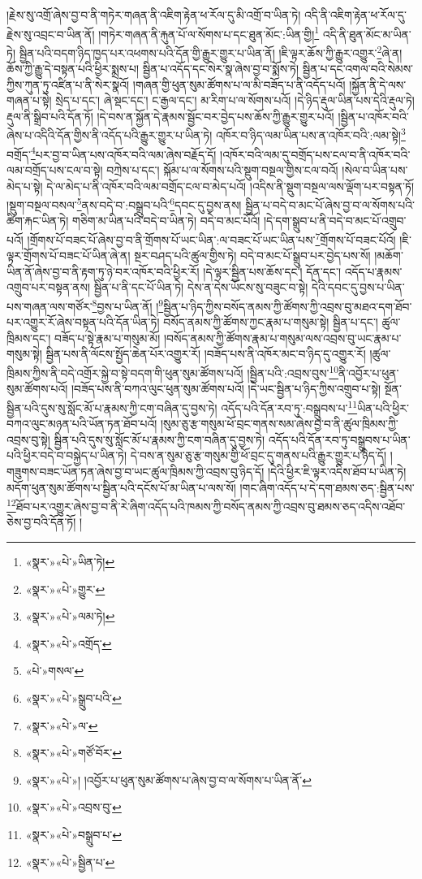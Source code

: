 །རྗེས་སུ་འགྲོ་ཞེས་བྱ་བ་ནི་གཏེར་གཞན་ནི་འཇིག་རྟེན་ཕ་རོལ་དུ་མི་འགྲོ་བ་ཡིན་ཏེ། འདི་ནི་འཇིག་རྟེན་ཕ་རོལ་དུ་རྗེས་སུ་འབྲང་བ་ཡིན་ནོ། །གཏེར་གཞན་ནི་རྐུན་པོ་ལ་སོགས་པ་དང་ཐུན་མོང་:ཡིན་གྱི།\footnote{«སྣར་»«པེ་»ཡིན་ཏེ།} འདི་ནི་ཐུན་མོང་མ་ཡིན་ཏེ། སྦྱིན་པའི་བདག་ཉིད་ཁྱད་པར་འཕགས་པའི་དོན་གྱི་རྒྱུར་གྱུར་པ་ཡིན་ནོ། །ཇི་ལྟར་ཆོས་ཀྱི་རྒྱུར་འགྱུར་\footnote{«སྣར་»«པེ་»གྱུར་}ཞེ་ན། ཆོས་ཀྱི་རྒྱུ་དེ་བསྟན་པའི་ཕྱིར་སྨྲས་པ། སྦྱིན་པ་འདོད་དང་སེར་སྣ་ཞེས་བྱ་བ་སྨོས་ཏེ། སྦྱིན་པ་དང་འགལ་བའི་སེམས་ཀྱིས་ཀུན་ཏུ་འཛིན་པ་ནི་སེར་སྣའོ། །གཞན་གྱི་ཕུན་སུམ་ཚོགས་པ་ལ་མི་བཟོད་པ་ནི་འདོད་པའོ། །སྐྱོན་ནི་དེ་ལས་གཞན་པ་སྟེ། སྲེད་པ་དང་། ཞེ་སྡང་དང་། ང་རྒྱལ་དང་། མ་རིག་པ་ལ་སོགས་པའོ། །དེ་ཉིད་རྡུལ་ཡིན་པས་དེའི་རྡུལ་ཏེ། རྡུལ་ནི་སྒྲིབ་པའི་དོན་ཏོ། །དེ་བས་ན་སྐྱོན་དེ་རྣམས་སྦྱོང་བར་བྱེད་པས་ཆོས་ཀྱི་རྒྱུར་གྱུར་པའོ། །སྦྱིན་པ་འཁོར་བའི་ཞེས་པ་འདིའི་དོན་གྱིས་ནི་འདོད་པའི་རྒྱུར་གྱུར་པ་ཡིན་ཏེ། འཁོར་བ་ཉིད་ལམ་ཡིན་པས་ན་འཁོར་བའི་:ལམ་སྟེ།\footnote{«སྣར་»«པེ་»ལམ་ཏེ།} བགྲོད་\footnote{«སྣར་»«པེ་»འགྲོད་}པར་བྱ་བ་ཡིན་པས་འཁོར་བའི་ལམ་ཞེས་བརྗོད་དོ། །འཁོར་བའི་ལམ་དུ་བགྲོད་པས་ངལ་བ་ནི་འཁོར་བའི་ལམ་བགྲོད་པས་ངལ་བ་སྟེ། བཀྲེས་པ་དང་། སྐོམ་པ་ལ་སོགས་པའི་སྡུག་བསྔལ་གྱིས་ངལ་བའོ། །སེལ་བ་ཡིན་པས་མེད་པ་སྟེ། དེ་ལ་མེད་པ་ནི་འཁོར་བའི་ལམ་བགྲོད་ངལ་བ་མེད་པའོ། །འདིས་ནི་སྡུག་བསྔལ་ལས་ལྡོག་པར་བསྟན་ཏོ། །སྡུག་བསྔལ་བསལ་\footnote{«པེ་»གསལ་}ནས་བདེ་བ་:བསྒྲུབ་པའི་\footnote{«སྣར་»«པེ་»སྒྲུབ་པའི་}དབང་དུ་བྱས་ནས། སྦྱིན་པ་བདེ་བ་མང་པོ་ཞེས་བྱ་བ་ལ་སོགས་པའི་ཚིག་རྐང་ཡིན་ཏེ། གཅིག་མ་ཡིན་པའི་བདེ་བ་ཡིན་ཏེ། བདེ་བ་མང་པོའོ། །དེ་དག་སྒྲུབ་པ་ནི་བདེ་བ་མང་པོ་འགྲུབ་པའོ། །གྲོགས་པོ་བཟང་པོ་ཞེས་བྱ་བ་ནི་གྲོགས་པོ་ཡང་ཡིན་:ལ་བཟང་པོ་ཡང་ཡིན་པས་\footnote{«སྣར་»«པེ་»ལ་}གྲོགས་པོ་བཟང་པོའོ། །ཇི་ལྟར་གྲོགས་པོ་བཟང་པོ་ཡིན་ཞེ་ན། སྔར་བཤད་པའི་ཚུལ་གྱིས་ཏེ། བདེ་བ་མང་པོ་སྒྲུབ་པར་བྱེད་པས་སོ། །མཆོག་ཡིན་ནོ་ཞེས་བྱ་བ་ནི་རྟག་ཏུ་ཉེ་བར་འཁོར་བའི་ཕྱིར་རོ། །དེ་ལྟར་སྦྱིན་པས་ཆོས་དང་། དོན་དང་། འདོད་པ་རྣམས་འགྲུབ་པར་བསྟན་ནས། སྦྱིན་པ་ནི་དང་པོ་ཡིན་ཏེ། དེས་ན་དེས་ཡོངས་སུ་བཟུང་བ་སྟེ། དེའི་དབང་དུ་བྱས་པ་ཡིན་པས་གཞན་ལས་གཙོར་\footnote{«སྣར་»«པེ་»གཙོ་བོར་}བྱས་པ་ཡིན་ནོ། །\footnote{«སྣར་»«པེ་»། །འབྱོར་པ་ཕུན་སུམ་ཚོགས་པ་ཞེས་བྱ་བ་ལ་སོགས་པ་ཡིན་ནོ་}སྦྱིན་པ་ཉིད་ཀྱིས་བསོད་ནམས་ཀྱི་ཚོགས་ཀྱི་འབྲས་བུ་མཐའ་དག་ཐོབ་པར་འགྱུར་རོ་ཞེས་བསྟན་པའི་དོན་ཡིན་ཏེ། བསོད་ནམས་ཀྱི་ཚོགས་ཀྱང་རྣམ་པ་གསུམ་སྟེ། སྦྱིན་པ་དང་། ཚུལ་ཁྲིམས་དང་། བཟོད་པ་སྟེ་རྣམ་པ་གསུམ་མོ། །བསོད་ནམས་ཀྱི་ཚོགས་རྣམ་པ་གསུམ་ལས་འབྲས་བུ་ཡང་རྣམ་པ་གསུམ་སྟེ། སྦྱིན་པས་ནི་ལོངས་སྤྱོད་ཆེན་པོར་འགྱུར་རོ། །བཟོད་པས་ནི་འཁོར་མང་བ་ཉིད་དུ་འགྱུར་རོ། །ཚུལ་ཁྲིམས་ཀྱིས་ནི་བདེ་འགྲོར་སྐྱེ་བ་སྟེ་བདག་གི་ཕུན་སུམ་ཚོགས་པའོ། །སྦྱིན་པའི་:འབྲས་བུས་\footnote{«སྣར་»«པེ་»འབྲས་བུ་}ནི་འབྱོར་པ་ཕུན་སུམ་ཚོགས་པའོ། །བཟོད་པས་ནི་བཀའ་ལུང་ཕུན་སུམ་ཚོགས་པའོ། །དེ་ཡང་སྦྱིན་པ་ཉིད་ཀྱིས་འགྲུབ་པ་སྟེ། སྔོན་སྦྱིན་པའི་དུས་སུ་སློང་མོ་པ་རྣམས་ཀྱི་ངག་བཞིན་དུ་བྱས་ཏེ། འདོད་པའི་དོན་རབ་ཏུ་:བསྒྲུབས་པ་\footnote{«སྣར་»«པེ་»བསྒྲུབ་པ་}ཡིན་པའི་ཕྱིར་བཀའ་ལུང་མཉན་པའི་ཡོན་ཏན་ཐོབ་པའོ། །སུམ་ཅུ་རྩ་གསུམ་ཕོ་བྲང་གནས་སམ་ཞེས་བྱ་བ་ནི་ཚུལ་ཁྲིམས་ཀྱི་འབྲས་བུ་སྟེ། སྦྱིན་པའི་དུས་སུ་སློང་མོ་པ་རྣམས་ཀྱི་ངག་བཞིན་དུ་བྱས་ཏེ། འདོད་པའི་དོན་རབ་ཏུ་བསྒྲུབས་པ་ཡིན་པའི་ཕྱིར་བདེ་བ་བསྐྱེད་པ་ཡིན་ཏེ། དེ་བས་ན་སུམ་ཅུ་རྩ་གསུམ་གྱི་ཕོ་བྲང་དུ་གནས་པའི་རྒྱུར་གྱུར་པ་ཉིད་དོ། །གཟུགས་བཟང་ཡོན་ཏན་ཞེས་བྱ་བ་ཡང་ཚུལ་ཁྲིམས་ཀྱི་འབྲས་བུ་ཉིད་དོ། །དེའི་ཕྱིར་ཇི་ལྟར་འདིས་ཐོབ་པ་ཡིན་ཏེ། མདོག་ཕུན་སུམ་ཚོགས་པ་སྦྱིན་པའི་དངོས་པོ་མ་ཡིན་པ་ལས་སོ། །གང་ཞིག་འདོད་པ་དེ་དག་ཐམས་ཅད་:སྦྱིན་པས་\footnote{«སྣར་»«པེ་»སྦྱིན་པ་}ཐོབ་པར་འགྱུར་ཞེས་བྱ་བ་ནི་རེ་ཞིག་འདོད་པའི་ཁམས་ཀྱི་བསོད་ནམས་ཀྱི་འབྲས་བུ་ཐམས་ཅད་འདིས་འཐོབ་ཅེས་བྱ་བའི་དོན་ཏོ། །
